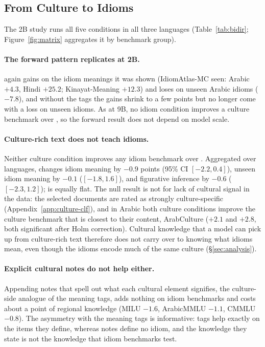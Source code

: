 \subsection{From Culture to Idioms}
\label{sec:results-reverse}



The 2B study runs all five conditions in all three languages (Table~\ref{tab:bidir}; Figure~\ref{fig:matrix} aggregates it by benchmark group).

\paragraph{The forward pattern replicates at 2B.}
\idiomcpt{} again gains on the idiom meanings it was shown (IdiomAtlas-MC seen: Arabic $+4.3$, Hindi $+25.2$; Kinayat-Meaning $+12.3$) and loses on unseen Arabic idioms ($-7.8$), and without the tags the gains shrink to a few points but no longer come with a loss on unseen idioms. As at 9B, no idiom condition improves a culture benchmark over \random{}, so the forward result does not depend on model scale.

\paragraph{Culture-rich text does not teach idioms.}
Neither culture condition improves any idiom benchmark over \random{}. Aggregated over languages, \culturecpt{} changes idiom meaning by $-0.9$ points (95\% CI $[-2.2, 0.4]$), unseen idiom meaning by $-0.1$ ($[-1.8, 1.6]$), and figurative inference by $-0.6$ ($[-2.3, 1.2]$); \culturenotes{} is equally flat. The null result is not for lack of cultural signal in the data: the selected documents are rated as strongly culture-specific (Appendix~\ref{app:culture-clf}), and in Arabic both culture conditions improve the culture benchmark that is closest to their content, ArabCulture ($+2.1$ and $+2.8$, both significant after Holm correction). Cultural knowledge that a model can pick up from culture-rich text therefore does not carry over to knowing what idioms mean, even though the idioms encode much of the same culture (\S\ref{sec:analysis}). 

\paragraph{Explicit cultural notes do not help either.}
Appending notes that spell out what each cultural element signifies, the culture-side analogue of the meaning tags, adds nothing on idiom benchmarks and costs about a point of regional knowledge (MILU $-1.6$, ArabicMMLU $-1.1$, CMMLU $-0.8$). The asymmetry with the meaning tags is informative: tags help exactly on the items they define, whereas notes define no idiom, and the knowledge they state is not the knowledge that idiom benchmarks test.

